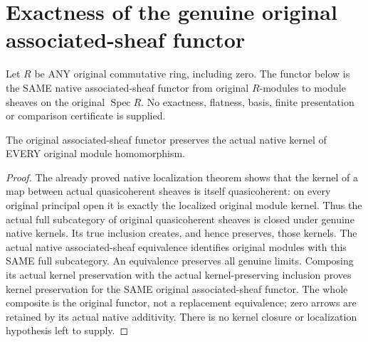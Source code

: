 \section{Exactness of the genuine original associated-sheaf functor}
\label{sec:tilde-exactness}

Let $R$ be ANY original commutative ring, including zero. The
functor below is the SAME native associated-sheaf functor from
original $R$-modules to module sheaves on the original
$\operatorname{Spec}R$. No exactness, flatness, basis, finite
presentation or comparison certificate is supplied.

\begin{theorem}
\label{lem:cartier-tilde-original-kernels}
\leanok
The original associated-sheaf functor preserves the actual native
kernel of EVERY original module homomorphism.
\end{theorem}
\begin{proof}
The already proved native localization theorem shows that the
kernel of a map between actual quasicoherent sheaves is itself
quasicoherent: on every original principal open it is exactly the
localized original module kernel. Thus the actual full subcategory
of original quasicoherent sheaves is closed under genuine native
kernels. Its true inclusion creates, and hence preserves, those
kernels. The actual native associated-sheaf equivalence identifies
original modules with this SAME full subcategory. An equivalence
preserves all genuine limits. Composing its actual kernel
preservation with the actual kernel-preserving inclusion proves
kernel preservation for the SAME original associated-sheaf
functor. The whole composite is the original functor, not a
replacement equivalence; zero arrows are retained by its actual
native additivity. There is no kernel closure or localization
hypothesis left to supply.
\end{proof}

